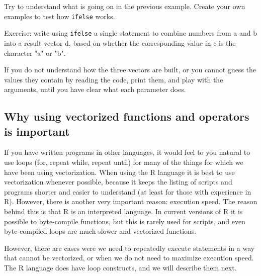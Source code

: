 \documentclass[paper=a4,10pt,div=17,headsepline,BCOR=12mm,twoside,open=right]{scrbook}\usepackage{knitr}
\begin{document}
Try to understand what is going on in the previous example. Create your own examples to test how \texttt{ifelse} works.

Exercise: write using \texttt{ifelse} a single statement to combine numbers from a and b into a result vector d, based on whether the corresponding value in c is the character "a" or "b".

\begin{knitrout}\footnotesize
{}\color{fgcolor}\begin{kframe}
\begin{alltt}
 \hlkwb{<-} \hlstd{(}\hlopt{-}\hlstd{,} \hlstd{)}
 \hlkwb{<-} \hlstd{(}\hlopt{+}\hlstd{,} \hlstd{)}
 \hlkwb{<-} \hlstd{(}\hlstd{(}\hlstd{,} \hlstd{),} \hlstd{(}\hlstd{,} \hlstd{))}
\end{alltt}
\end{kframe}
\end{knitrout}

If you do not understand how the three vectors are built, or you cannot guess the values they contain by reading the code, print them, and play with the arguments, until you have clear what each parameter does.

\subsection{Why using vectorized functions and operators is important}

If you have written programs in other languages, it would feel to you natural to use loops (for, repeat while, repeat until) for many of the things for which we have been using vectorization. When using the R language it is best to use vectorization whenever possible, because it keeps the listing of scripts and programs shorter and easier to understand (at least for those with experience in R). However, there is another very important reason: execution speed. The reason behind this is that R is an interpreted language. In current versions of R it is possible to byte-compile functions, but this is rarely used for scripts, and even byte-compiled loops are much slower and vectorized functions.

However, there are cases were we need to repeatedly execute statements in a way that cannot be vectorized, or when we do not need to maximize execution speed. The R language does have loop constructs, and we will describe them next.
\end{document}
